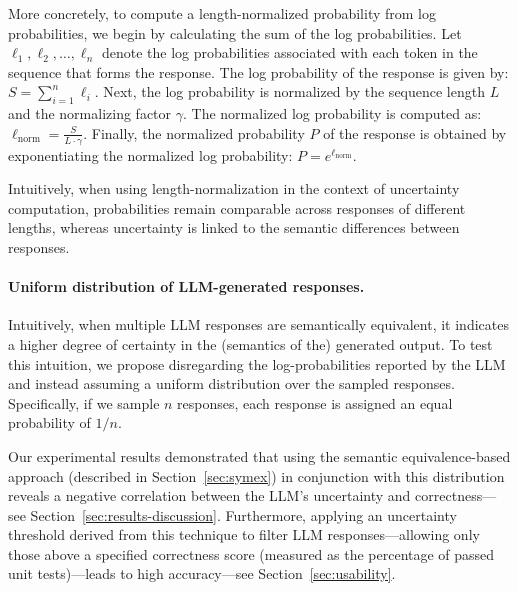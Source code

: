 More concretely, to compute a length-normalized probability from log probabilities, we begin by calculating the sum of the log probabilities. 
Let \(\ell_1, \ell_2, \dots, \ell_n\) denote the log probabilities associated with each token in the sequence that forms the response.
The log probability of the response is given by:
$S = \sum_{i=1}^{n} \ell_i$.
%
Next, the log probability is normalized by the sequence length \(L\) and the normalizing factor \(\gamma\). 
The normalized log probability is computed as:
$\ell_{\text{norm}} = \frac{S}{L \cdot \gamma}$.
%
Finally, the normalized probability \(P\) of the response is obtained by exponentiating the normalized log probability:
$P = e^{\ell_{\text{norm}}}$.

Intuitively, when using length-normalization in the context of uncertainty computation, probabilities remain comparable across responses of different lengths, whereas uncertainty is linked to the semantic differences between responses. %

\paragraph{Uniform distribution of LLM-generated responses.}
Intuitively, when multiple LLM responses are semantically equivalent, it indicates a higher degree of certainty in the (semantics of the) generated output.
To test this intuition, we propose disregarding the log-probabilities reported by the LLM and instead assuming a uniform distribution over the sampled responses. 
Specifically, if we sample $n$ responses, each response is assigned an equal probability of $1/n$.

Our experimental results demonstrated that using the semantic equivalence-based approach (described in Section~\ref{sec:symex}) in conjunction with this distribution reveals a negative correlation between the LLM's uncertainty and correctness---see Section~\ref{sec:results-discussion}. 
Furthermore, applying an uncertainty threshold derived from this technique to filter LLM responses—allowing only those above a specified correctness score (measured as the percentage of passed unit tests)—leads to high accuracy---see Section~\ref{sec:usability}.





